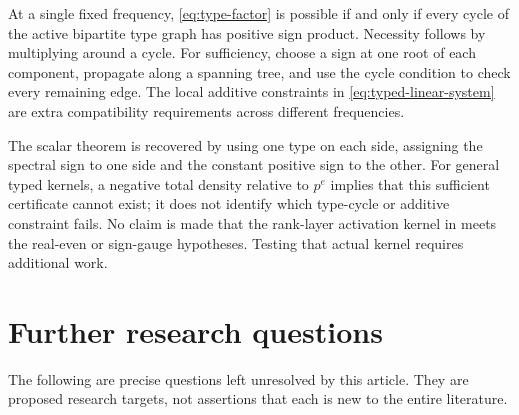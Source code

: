 \documentclass[11pt]{article}
\numberwithin{equation}{section}
\theoremstyle{definition}
\theoremstyle{remark}
\begin{document}
At a single fixed frequency, \eqref{eq:type-factor} is possible if and
only if every cycle of the active bipartite type graph has positive sign
product. Necessity follows by multiplying around a cycle. For
sufficiency, choose a sign at one root of each component, propagate
along a spanning tree, and use the cycle condition to check every
remaining edge. The local additive constraints in
\eqref{eq:typed-linear-system} are extra compatibility requirements
across different frequencies.

The scalar theorem is recovered by using one type on each side,
assigning the spectral sign to one side and the constant positive sign
to the other. For general typed kernels, a negative total density
relative to $p^e$ implies that this sufficient certificate cannot exist;
it does not identify which type-cycle or additive constraint fails.
No claim is made that the rank-layer activation kernel in
\cite{OpenAIKernel} meets the real-even or sign-gauge hypotheses. Testing
that actual kernel requires additional work.

\section{Further research questions}
\label{sec:questions}

The following are precise questions left unresolved by this article.
They are proposed research targets, not assertions that each is new to
the entire literature.
\end{document}
